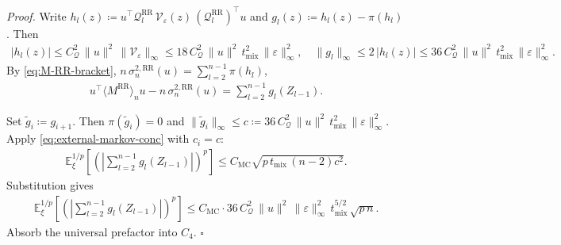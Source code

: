 \textit{Proof.} Write \(h_l(z) \coloneqq u^\top \mathcal{Q}_l^{\text{RR}} \, \mathcal{V}_{\varepsilon}(z) \, (\mathcal{Q}_l^{\text{RR}})^\top u\)
and \(g_l(z) \coloneqq h_l(z) - \pi(h_l)\). Then
\begin{equation}
\begin{aligned}
|h_l(z)|
  \le C_{\mathcal{Q}}^2 \, \lVert  u  \rVert^2 \, \lVert  \mathcal{V}_{\varepsilon}  \rVert_\infty
  \le 18 \, C_{\mathcal{Q}}^2 \, \lVert  u  \rVert^2 \, t_{\text{mix}}^2 \, \lVert  \varepsilon  \rVert_\infty^2,
\quad
\lVert  g_l  \rVert_\infty \le 2 \, |h_l(z)|
  \le 36 \, C_{\mathcal{Q}}^2 \, \lVert  u  \rVert^2 \, t_{\text{mix}}^2 \, \lVert  \varepsilon  \rVert_\infty^2.
\end{aligned}
\end{equation}
By \eqref{eq:M-RR-bracket},
\(n \, \sigma_n^{2, \text{RR}}(u) = \sum_{l = 2}^{n - 1} \pi(h_l)\),
\begin{equation}
\begin{aligned}
u^\top \langle M^{\text{RR}} \rangle_n u - n \, \sigma_n^{2, \text{RR}}(u)
  = \sum_{l = 2}^{n - 1} g_l(Z_{l - 1}).
\end{aligned}
\label{eq:M-RR-conc-decomp}
\end{equation}

Set \(\widetilde{g}_i \coloneqq g_{i + 1}\). Then \(\pi(\widetilde{g}_i) = 0\) and
\(\lVert  \widetilde{g}_i  \rVert_\infty \le c \coloneqq 36 \, C_{\mathcal{Q}}^2 \, \lVert  u  \rVert^2 \, t_{\text{mix}}^2 \, \lVert  \varepsilon  \rVert_\infty^2\).
Apply \eqref{eq:external-markov-conc} with \(c_i = c\):
\begin{equation}
\begin{aligned}
\mathbb{E}_\xi^{1 / p} \left[
  \left(|\sum_{l = 2}^{n - 1} g_l(Z_{l - 1})|\right)^p
\right]
  \le C_{\text{MC}} \sqrt{p \, t_{\text{mix}} \, (n - 2) c^2}.
\end{aligned}
\end{equation}
Substitution gives
\begin{equation}
\begin{aligned}
\mathbb{E}_\xi^{1 / p} \left[
  \left(|\sum_{l = 2}^{n - 1} g_l(Z_{l - 1})|\right)^p
\right]
  \le C_{\text{MC}} \cdot 36 \, C_{\mathcal{Q}}^2 \, \lVert  u  \rVert^2
       \, \lVert  \varepsilon  \rVert_\infty^2 \, t_{\text{mix}}^{5 / 2}
       \, \sqrt{p \, n}.
\end{aligned}
\end{equation}
Absorb the universal prefactor into \(C_4\). \(\square\)

